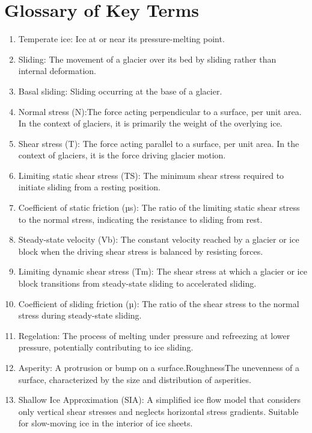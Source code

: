 \chapter{Glossary of Key Terms}\label{glossary}
\begin{enumerate}
\item Temperate ice: Ice at or near its pressure-melting point.
\item Sliding: The movement of a glacier over its bed by sliding rather than internal deformation.
\item Basal sliding: Sliding occurring at the base of a glacier.
\item Normal stress (N):The force acting perpendicular to a surface, per unit area. In the context of glaciers, it is primarily the weight of the overlying ice.
\item Shear stress (T): The force acting parallel to a surface, per unit area. In the context of glaciers, it is the force driving glacier motion.
\item Limiting static shear stress (TS): The minimum shear stress required to initiate sliding from a resting position.
\item Coefficient of static friction (µs): The ratio of the limiting static shear stress to the normal stress, indicating the resistance to sliding from rest.
\item Steady-state velocity (Vb): The constant velocity reached by a glacier or ice block when the driving shear stress is balanced by resisting forces.
\item Limiting dynamic shear stress (Tm): The shear stress at which a glacier or ice block transitions from steady-state sliding to accelerated sliding.
\item Coefficient of sliding friction (µ): The ratio of the shear stress to the normal stress during steady-state sliding.
\item Regelation: The process of melting under pressure and refreezing at lower pressure, potentially contributing to ice sliding.
\item Asperity: A protrusion or bump on a surface.RoughnessThe unevenness of a surface, characterized by the size and distribution of asperities.
\item Shallow Ice Approximation (SIA): A simplified ice flow model that considers only vertical shear stresses and neglects horizontal stress gradients. Suitable for slow-moving ice in the interior of ice sheets.

\end{enumerate}
